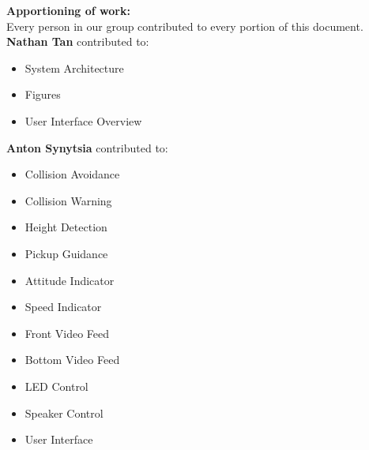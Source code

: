 \documentclass[onecolumn, oneside, letterpaper, draftclsnofoot, 10pt, compsoc]{IEEEtran}
\begin{document}
\begin{titlepage}
\begin{singlespace}
\begin{abstract}
        This design document outlines the overall software architecture of OSU\textquotesingle s MAV system. It outlines the data the software will receive from the MAV\textquotesingle s onboard transmitter. Next, the document covers how the received data is processed, organized, and used by each software block. The data pipeline is described in detail, from the origin source, through each sorting and processing step, and finally to useful information displayed for pilot consumption. The design and layout of the GUI is also discussed, including the value of the displayed information to the pilot. Each facet of the MAV's software is covered.
        \end{abstract}
    \end{singlespace}
\end{titlepage}
\newpage
{}
\tableofcontents
\listoffigures
\clearpage

\noindent\textbf{Apportioning of work:}\\
\noindent Every person in our group contributed to every portion of this document.\\

\noindent\textbf{Nathan Tan} contributed to:
\begin{itemize}
    \item System Architecture
    \item Figures
    \item User Interface Overview
\end{itemize}

\noindent\textbf{Anton Synytsia} contributed to:
\begin{itemize}
    \item Collision Avoidance
    \item Collision Warning
    \item Height Detection
    \item Pickup Guidance
    \item Attitude Indicator
    \item Speed Indicator
    \item Front Video Feed
    \item Bottom Video Feed
    \item LED Control
    \item Speaker Control
    \item User Interface
\end{itemize}
\end{document}
